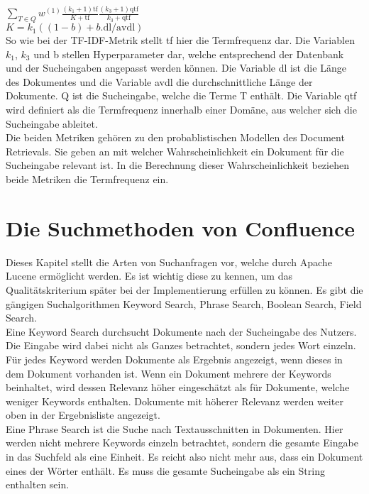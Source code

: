 \(\sum_{T \in Q}w^{(1)} \frac{(k_1 + 1)\text{tf}}{K + \text{tf}} \frac{(k_3 + 1)\text{qtf}}{k_3 + \text{qtf}}\)\\

\(K=k_1((1 - b) + b.\text{dl} / \text{avdl})\)\\

So wie bei der TF-IDF-Metrik stellt tf hier die Termfrequenz dar.
Die Variablen \(k_1\), \(k_3\) und b stellen Hyperparameter dar, welche entsprechend der Datenbank und der Sucheingaben angepasst werden können.
Die Variable dl ist die Länge des Dokumentes und die Variable avdl die durchschnittliche Länge der Dokumente.
Q ist die Sucheingabe, welche die Terme T enthält.
Die Variable qtf wird definiert als die Termfrequenz innerhalb einer Domäne, aus welcher sich die Sucheingabe ableitet.\\

Die beiden Metriken gehören zu den probablistischen Modellen des Document Retrievals.
Sie geben an mit welcher Wahrscheinlichkeit ein Dokument für die Sucheingabe relevant ist.
In die Berechnung dieser Wahrscheinlichkeit beziehen beide Metriken die Termfrequenz ein.

\section{Die Suchmethoden von Confluence}
\label{chap:suchmethoden-von-confluence}
Dieses Kapitel stellt die Arten von Suchanfragen vor, welche durch Apache Lucene ermöglicht werden.
Es ist wichtig diese zu kennen, um das Qualitätskriterium später bei der Implementierung erfüllen zu können.
Es gibt die gängigen Suchalgorithmen Keyword Search, Phrase Search, Boolean Search, Field Search.\\

Eine Keyword Search durchsucht Dokumente nach der Sucheingabe des Nutzers.
Die Eingabe wird dabei nicht als Ganzes betrachtet, sondern jedes Wort einzeln.
Für jedes Keyword werden Dokumente als Ergebnis angezeigt, wenn dieses in dem Dokument vorhanden ist.
Wenn ein Dokument mehrere der Keywords beinhaltet, wird dessen Relevanz höher eingeschätzt als für Dokumente, welche weniger Keywords enthalten.
Dokumente mit höherer Relevanz werden weiter oben in der Ergebnisliste angezeigt.\\

Eine Phrase Search ist die Suche nach Textausschnitten in Dokumenten.
Hier werden nicht mehrere Keywords einzeln betrachtet, sondern die gesamte Eingabe in das Suchfeld als eine Einheit.
Es reicht also nicht mehr aus, dass ein Dokument eines der Wörter enthält.
Es muss die gesamte Sucheingabe als ein String enthalten sein.\\

